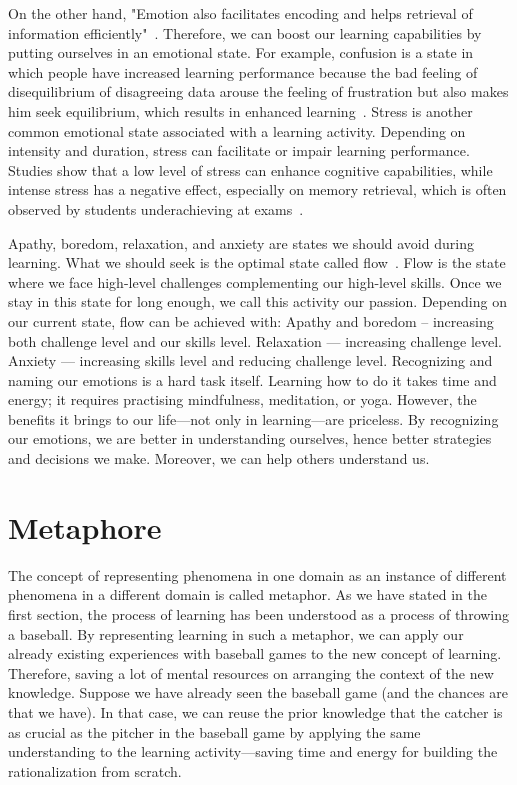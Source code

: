\documentclass{article}
\begin{document}
On the other hand, "Emotion also facilitates encoding and helps retrieval of information efficiently"~\cite{tyng2017influences}. Therefore, we can boost our learning capabilities by putting ourselves in an emotional state. For example, confusion is a state in which people have increased learning performance because the bad feeling of disequilibrium of disagreeing data arouse the feeling of frustration but also makes him seek equilibrium, which results in enhanced learning~\cite{d2014confusion}. Stress is another common emotional state associated with a learning activity. Depending on intensity and duration, stress can facilitate or impair learning performance. Studies show that a low level of stress can enhance cognitive capabilities, while intense stress has a negative effect, especially on memory retrieval, which is often observed by students underachieving at exams~\cite{vogel2016learning}. 

Apathy, boredom, relaxation, and anxiety are states we should avoid during learning. What we should seek is the optimal state called flow~\cite{csikszentmihalyi1990flow}. Flow is the state where we face high-level challenges complementing our high-level skills. Once we stay in this state for long enough, we call this activity our passion.  Depending on our current state, flow can be achieved with:
Apathy and boredom – increasing both challenge level and our skills level.
Relaxation — increasing challenge level.
Anxiety — increasing skills level and reducing challenge level.
Recognizing and naming our emotions is a hard task itself. Learning how to do it takes time and energy; it requires practising mindfulness, meditation, or yoga. However, the benefits it brings to our life—not only in learning—are priceless. By recognizing our emotions, we are better in understanding ourselves, hence better strategies and decisions we make. Moreover, we can help others understand us.

\section{Metaphore}
The concept of representing phenomena in one domain as an instance of different phenomena in a different domain is called metaphor. As we have stated in the first section, the process of learning has been understood as a process of throwing a baseball. By representing learning in such a metaphor, we can apply our already existing experiences with baseball games to the new concept of learning. Therefore, saving a lot of mental resources on arranging the context of the new knowledge. Suppose we have already seen the baseball game (and the chances are that we have). In that case, we can reuse the prior knowledge that the catcher is as crucial as the pitcher in the baseball game by applying the same understanding to the learning activity—saving time and energy for building the rationalization from scratch.
\end{document}
